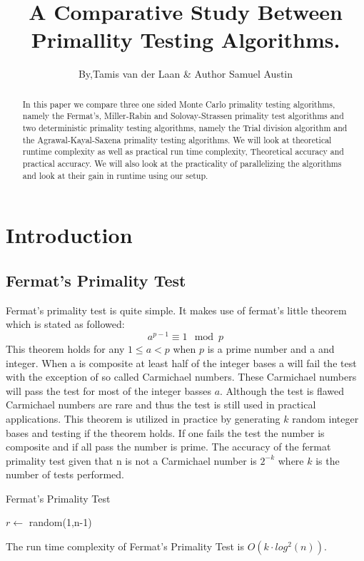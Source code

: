 \documentclass[compressed,final,notitlepage,narroweqnarray,inline,twoside,]{ieee}
\title[TITLE]{A Comparative Study Between Primallity Testing Algorithms.}
\author{By,Tamis van der Laan \& Author Samuel Austin }
\begin{document}
\maketitle

\begin{abstract}
In this paper we compare three one sided Monte Carlo primality testing algorithms, namely the Fermat’s, Miller-Rabin and Solovay-Strassen primality test algorithms and two deterministic primality testing algorithms, namely the Trial division algorithm and the Agrawal-Kayal-Saxena primality testing algorithms.  We will look at theoretical runtime complexity as well as practical run time complexity, Theoretical accuracy and practical accuracy. We will also look at the practicality of parallelizing the algorithms and look at their gain in runtime using our setup.
\end{abstract}
\section{Introduction}
\subsection{Fermat's Primality Test}
Fermat's primality test is quite simple. It makes use of fermat’s little theorem \cite{FLT} which is stated as followed: 
\begin{equation}
a^{p-1} \equiv  1 \mod p
\end{equation}
This theorem holds for any $1 \leq a < p$ when $p$ is a prime number and a and integer. When a is composite at least half of the integer bases a will fail the test with the exception of so called Carmichael numbers. These Carmichael numbers will pass the test for most of the integer basses $a$. Although the test is flawed Carmichael numbers are rare and thus the test is still used in practical applications. This theorem is utilized in practice by generating $k$ random integer bases and testing if the theorem holds. If one fails the test the number is composite and if all pass the number is prime. The accuracy of the fermat primality test given that n is not a Carmichael number is $2^{-k}$ where $k$ is the number of tests performed.
\begin{algorithm}[ht]
 \caption{Fermat's Primality Test}
 {
	$r \longleftarrow$ random(1,n-1) \;
	{
		\;
	}
 }
 \;
\end{algorithm}
The run time complexity of Fermat’s Primality Test is $O(k \cdot log^2(n))$.
\end{document}
